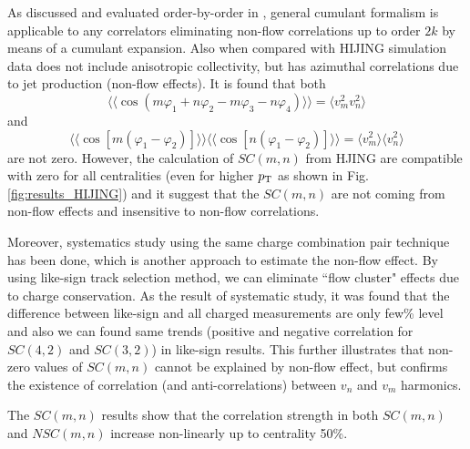 As discussed and evaluated order-by-order in \cite{Gyulassy:1994ew}, general cumulant formalism is applicable to any correlators eliminating non-flow correlations up to order $2k$ by means of a cumulant expansion. Also when compared with HIJING simulation data\cite{PhysRevD.44.3501} does not include anisotropic collectivity, but has azimuthal correlations due to jet production (non-flow effects)\cite{Borghini:2000sa}.  It is found that both $$\langle \langle \cos{(m\varphi_1 + n\varphi_2 - m\varphi_3 - n\varphi_4)} \rangle \rangle = \langle v_m^2 v_n^2 \rangle $$ and  $$\langle \langle  \cos[m(\varphi_1 - \varphi_2)] \rangle \rangle \langle \langle  \cos[n(\varphi_1 - \varphi_2)] \rangle \rangle = \langle v_m^2 \rangle \langle v_n^2 \rangle$$ are not zero. However, the calculation of $SC(m,n)$ from HJING are compatible with zero for all centralities (even for higher $p_{\rm{T}}$ as shown in Fig.\ref{fig:results_HIJING}) and it suggest that the $SC(m,n)$ are not coming from non-flow effects and insensitive to non-flow correlations.

Moreover, systematics study using the same charge combination pair technique has been done, which is another approach to estimate the non-flow effect. By using like-sign track selection method, we can eliminate ``flow cluster" effects due to charge conservation. As the result of systematic study, it was found that the difference between like-sign and all charged measurements are only few\% level and also we can found same trends (positive and negative correlation for $SC(4,2)$ and $SC(3,2)$) in like-sign results. This further illustrates that non-zero values of $SC(m,n)$ cannot be explained by non-flow effect, but confirms the existence of correlation (and anti-correlations) between $v_n$ and $v_m$ harmonics.

The $SC(m,n)$ results show that the correlation strength in both $SC(m,n)$ and $NSC(m,n)$ increase non-linearly up to centrality 50\%. 

